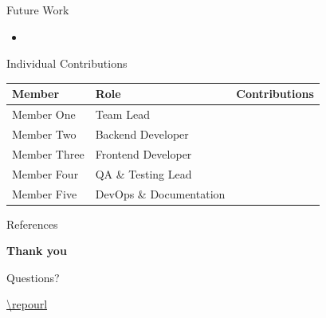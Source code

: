 \documentclass[aspectratio=169,11pt]{beamer}
\begin{document}
\begin{frame}{Future Work}
    \begin{itemize}
        \item {}
    \end{itemize}
\end{frame}

\ifindividualproject\else
\begin{frame}{Individual Contributions}
    \centering
    \begin{tabular}{llp{}}
        \toprule
        Member & Role & Contributions \\
        \midrule
        Member One & Team Lead & \\
        Member Two & Backend Developer & \\
        Member Three & Frontend Developer & \\
        Member Four & QA \& Testing Lead & \\
        Member Five & DevOps \& Documentation & \\
        \bottomrule
    \end{tabular}

    \vspace{1em}
\end{frame}
\fi

\begin{frame}[allowframebreaks]{References}
    \printbibliography[heading=none]
\end{frame}

\begin{frame}[plain]
    \centering
    {\Large\bfseries{} Thank you\par}
    \vspace{1em}
    Questions?\par
    \vspace{1em}
    {\small\url{\repourl}}
\end{frame}
\end{document}

